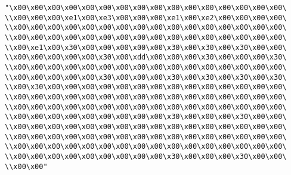 \verb|"\x00\x00\x00\x00\x00\x00\x00\x00\x00\x00\x00\x00\x00\x00\x00\x00\|\newline
\verb|\\x00\x00\x00\xe1\x00\xe3\x00\x00\x00\xe1\x00\xe2\x00\x00\x00\x00\|\newline
\verb|\\x00\x00\x00\x00\x00\x00\x00\x00\x00\x00\x00\x00\x00\x00\x00\x00\|\newline
\verb|\\x00\x00\x00\x00\x00\x00\x00\x00\x00\x00\x00\x00\x00\x00\x00\x00\|\newline
\verb|\\x00\xe1\x00\x30\x00\x00\x00\x00\x00\x30\x00\x30\x00\x30\x00\x00\|\newline
\verb|\\x00\x00\x00\x00\x00\x30\x00\xdd\x00\x00\x00\x30\x00\x00\x00\x30\|\newline
\verb|\\x00\x00\x00\x00\x00\x00\x00\x00\x00\x00\x00\x00\x00\x00\x00\x00\|\newline
\verb|\\x00\x00\x00\x00\x00\x30\x00\x00\x00\x30\x00\x30\x00\x30\x00\x30\|\newline
\verb|\\x00\x30\x00\x00\x00\x00\x00\x00\x00\x00\x00\x00\x00\x00\x00\x00\|\newline
\verb|\\x00\x00\x00\x00\x00\x00\x00\x00\x00\x00\x00\x00\x00\x00\x00\x00\|\newline
\verb|\\x00\x00\x00\x00\x00\x00\x00\x00\x00\x00\x00\x00\x00\x00\x00\x00\|\newline
\verb|\\x00\x00\x00\x00\x00\x00\x00\x00\x00\x30\x00\x00\x00\x30\x00\x00\|\newline
\verb|\\x00\x00\x00\x00\x00\x00\x00\x00\x00\x00\x00\x00\x00\x00\x00\x00\|\newline
\verb|\\x00\x00\x00\x00\x00\x00\x00\x00\x00\x00\x00\x00\x00\x00\x00\x00\|\newline
\verb|\\x00\x00\x00\x00\x00\x00\x00\x00\x00\x00\x00\x00\x00\x00\x00\x00\|\newline
\verb|\\x00\x00\x00\x00\x00\x00\x00\x00\x00\x30\x00\x00\x00\x30\x00\x00\|\newline
\verb|\\x00\x00"|\newline
